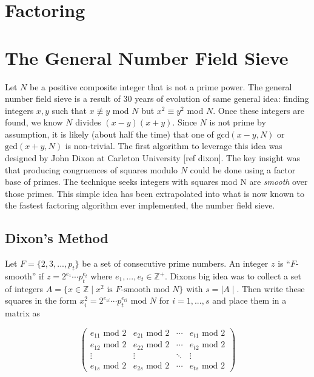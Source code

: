 \documentclass[10pt,a4paper]{article}
\theoremstyle{plain}
\theoremstyle{definition}
\theoremstyle{remark}
\newcommand{\Z}{\mathbb{Z}}
\begin{document}
\section{Factoring}
\section{The General Number Field Sieve}


Let $N$ be a positive composite integer that is not a prime power. The general number field sieve is a result of 30 years of evolution of same general idea: finding integers $x,y$ such that $x \not\equiv y$ mod $N$ but $x^2 \equiv y^ 2$ mod $N$. Once these integers are found, we know $N$ divides $(x - y)(x+y)$. Since $N$ is not prime by assumption, it is likely (about half the time) that one of $\text{gcd}(x-y,N)$ or  $\text{gcd}(x+y,N)$ is non-trivial. The first algorithm to leverage this idea was designed by John Dixon at Carleton University [ref dixon]. The key insight was that producing congruences of squares modulo $N$ could be done using a factor base of primes. The technique seeks integers with squares mod N are \textit{smooth} over those primes. This simple idea has been extrapolated into what is now known to the fastest factoring algorithm ever implemented, the number field sieve. \\

\subsection{Dixon's Method}
  Let $F = \lbrace 2,3,...,p_t \rbrace$ be a set of consecutive prime numbers. An integer $z$ is “$F$-smooth” if $z = 2^{e_1} \cdots p_t^{e_t} $ where $e_1,...,e_t \in \mathbb{Z}^+$. Dixons big idea was to collect a set of integers $A = \lbrace x \in \Z \mid x^2 \text{ is }F\text{-smooth mod } N \rbrace $ with $s = \mid A \mid $. Then write these squares in the form $x_i^2 = 2^{e_{1i}}  \cdots p_{t}^{e_{ti}} \text{ mod } N$ for $i = 1,...,s$ and place them in a matrix as 

  $$
  \begin{pmatrix}
    e_{11} \text{ mod } 2 & e_{21} \text{ mod } 2 & \cdots & e_{t1} \text{ mod } 2 \\
    e_{12} \text{ mod } 2 & e_{22} \text{ mod } 2 & \cdots & e_{t2} \text{ mod } 2 \\
    \vdots  & \vdots  & \ddots & \vdots  \\
    e_{1s} \text{ mod } 2 & e_{2s} \text{ mod } 2 & \cdots & e_{ts} \text{ mod } 2 
   \end{pmatrix}
  $$
\end{document}
